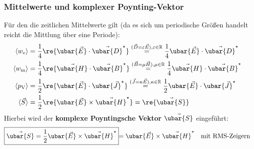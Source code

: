   \subsubsection{Mittelwerte und komplexer Poynting-Vektor}
	  Für den die zeitlichen Mittelwerte gilt (da es sich um periodische Größen handelt reicht die Mittlung über eine Periode):
		        \begin{align}
			        \langle w_\text{e} \rangle    & = \frac{1}{4}\re{\ubar{\vec{E}} \cdot \vec{\ubar{D}}^\star} \stackrel{(\vec{D} =\varepsilon\vec{E}), \varepsilon\in \mathbb{R}}{=} \frac{1}{4}\ubar{\vec{E}} \cdot \vec{\ubar{D}}^\star \label{kompledichtmag}\\
			        \langle w_\text{m} \rangle    & = \frac{1}{4}\re{\vec{\ubar{H}} \cdot \vec{\ubar{B}}^\star} \stackrel{(\vec{B} =\mu\vec{H} ), \mu\in \mathbb{R}}{=} \frac{1}{4}\vec{\ubar{H}} \cdot \vec{\ubar{B}}^\star                \label{komplmdichtmag}\\
			        \langle p_\text{V} \rangle    & = \frac{1}{2}\re{\ubar{\vec{E}} \cdot \ubar{\vec{J}}^\star} \stackrel{(\vec{J}=\kappa\vec{E}), \kappa\in \mathbb{R}  }{=}\frac{1}{2}\ubar{\vec{E}} \cdot \ubar{\vec{J}}^\star       \\
			        \langle \vec{S}\rangle & = \frac{1}{2}\re{\ubar{\vec{E}} \times \vec{\ubar{H}}^\star} = \re{\vec{\ubar{S}}} \label{komplpoyntmit}
		\end{align}
		   Hierbei wird der \textbf{komplexe Poyntingsche Vektor} $\vec{\ubar{S}}$ eingeführt:
		        \begin{equation}\begin{split}
				        \boxed{\vec{\ubar{S}} = \frac{1}{2}\ubar{\vec{E}} \times \vec{\ubar{H}}^\star} {\color{blue}=\ubar{\vec{E}} \times \vec{\ubar{H}}^\star \quad\text{mit RMS-Zeigern}}
			        \end{split}\end{equation}
		     
